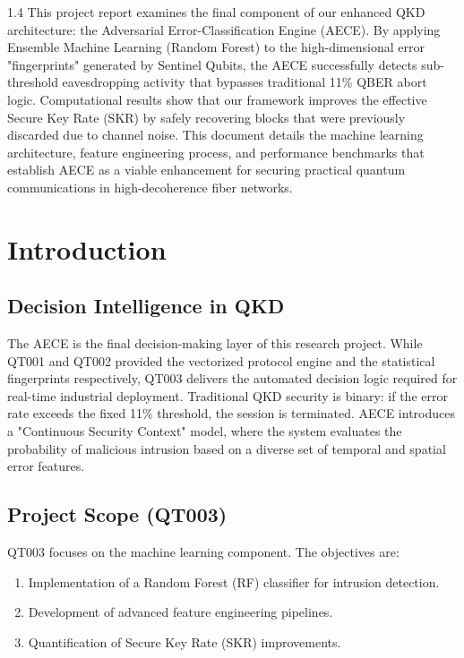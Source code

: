 \documentclass[journal,onecolumn,12pt,draftclsnofoot]{IEEEtran}
\begin{document}
\begin{spacing}{1.4}
\large
This project report examines the final component of our enhanced QKD architecture: the Adversarial Error-Classification Engine (AECE). By applying Ensemble Machine Learning (Random Forest) to the high-dimensional error "fingerprints" generated by Sentinel Qubits, the AECE successfully detects sub-threshold eavesdropping activity that bypasses traditional 11\% QBER abort logic. Computational results show that our framework improves the effective Secure Key Rate (SKR) by safely recovering blocks that were previously discarded due to channel noise. This document details the machine learning architecture, feature engineering process, and performance benchmarks that establish AECE as a viable enhancement for securing practical quantum communications in high-decoherence fiber networks.
\end{spacing}

\newpage

\tableofcontents
\newpage


\section{Introduction}

\subsection{Decision Intelligence in QKD}
The AECE is the final decision-making layer of this research project. While QT001 and QT002 provided the vectorized protocol engine and the statistical fingerprints respectively, QT003 delivers the automated decision logic required for real-time industrial deployment. Traditional QKD security is binary: if the error rate exceeds the fixed 11\% threshold, the session is terminated. AECE introduces a "Continuous Security Context" model, where the system evaluates the probability of malicious intrusion based on a diverse set of temporal and spatial error features.

\subsection{Project Scope (QT003)}
QT003 focuses on the machine learning component. The objectives are:
\begin{enumerate}
    \item Implementation of a Random Forest (RF) classifier for intrusion detection.
    \item Development of advanced feature engineering pipelines.
    \item Quantification of Secure Key Rate (SKR) improvements.
\end{enumerate}
\end{document}
